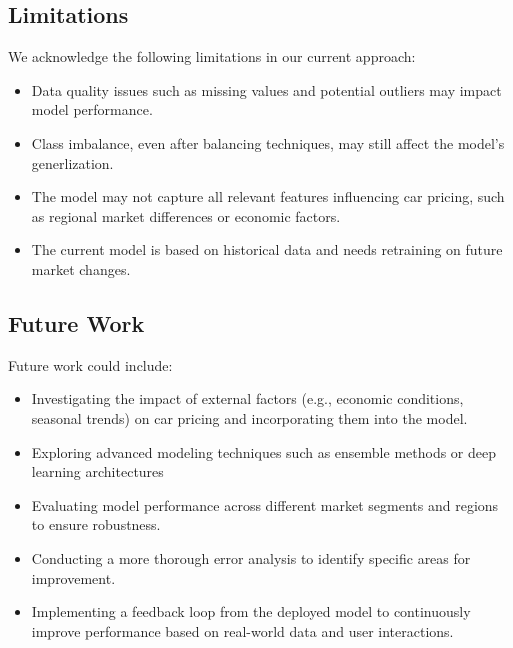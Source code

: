 \documentclass[12pt, a4paper]{article}
\begin{document}
\subsection{Limitations}
We acknowledge the following limitations in our current approach:
\begin{itemize}
  \item Data quality issues such as missing values and potential outliers may impact model performance.
  \item Class imbalance, even after balancing techniques, may still affect the model's generlization.
  \item The model may not capture all relevant features influencing car pricing, such as regional market differences or economic factors.
  \item The current model is based on historical data and needs retraining on future market changes.
\end{itemize}

\subsection{Future Work}
Future work could include:
\begin{itemize}
  \item  Investigating the impact of external factors (e.g., economic conditions, seasonal trends) on car pricing and incorporating them into the model.
  \item Exploring advanced modeling techniques such as ensemble methods or deep learning architectures
  \item  Evaluating model performance across different market segments and regions to ensure robustness.
  \item Conducting a more thorough error analysis to identify specific areas for improvement.
  \item Implementing a feedback loop from the deployed model to continuously improve performance based on real-world data and user interactions.
\end{itemize}
\end{document}

